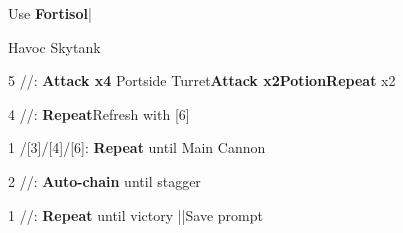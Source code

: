 \begin{mainlist}
	\item Use \textbf{Fortisol}|
\end{mainlist}
\begin{fight}{Havoc Skytank}
	\item [5] \com/\com/\syn: \textbf{Attack x4} Portside Turret\to \textbf{Attack x2}\to \textbf{Potion}\to \textbf{Repeat} x2
	\item [4] \com/\com/\med: \textbf{Repeat}\to Refresh with [6]
	\item [1]/[3]/[4]/[6]: \textbf{Repeat} until Main Cannon
	\item [2] \rav/\com/\rav: \textbf{Auto-chain} until stagger
	\item [1] \com/\com/\rav: \textbf{Repeat} until victory |\skip|Save prompt
\end{fight}
